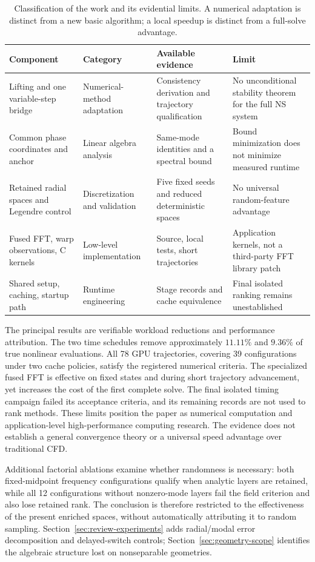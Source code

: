 \begin{table}[!htbp]
\centering\small
\caption{Classification of the work and its evidential limits. A numerical adaptation is distinct from a new basic algorithm; a local speedup is distinct from a full-solve advantage.}
\label{tab:contribution-map}
\begin{tabularx}{\linewidth}{@{}>{\raggedright\arraybackslash}p{.20\linewidth}XXX@{}}
\toprule
Component & Category & Available evidence & Limit \\
\midrule
Lifting and one variable-step bridge & Numerical-method adaptation & Consistency derivation and trajectory qualification & No unconditional stability theorem for the full NS system \\
Common phase coordinates and anchor & Linear algebra analysis & Same-mode identities and a spectral bound & Bound minimization does not minimize measured runtime \\
Retained radial spaces and Legendre control & Discretization and validation & Five fixed seeds and reduced deterministic spaces & No universal random-feature advantage \\
Fused FFT, warp observations, C kernels & Low-level implementation & Source, local tests, short trajectories & Application kernels, not a third-party FFT library patch \\
Shared setup, caching, startup path & Runtime engineering & Stage records and cache equivalence & Final isolated ranking remains unestablished \\
\bottomrule
\end{tabularx}
\end{table}

The principal results are verifiable workload reductions and performance attribution. The two time schedules remove approximately $11.11\%$ and $9.36\%$ of true nonlinear evaluations. All 78 GPU trajectories, covering 39 configurations under two cache policies, satisfy the registered numerical criteria. The specialized fused FFT is effective on fixed states and during short trajectory advancement, yet increases the cost of the first complete solve. The final isolated timing campaign failed its acceptance criteria, and its remaining records are not used to rank methods. These limits position the paper as numerical computation and application-level high-performance computing research. The evidence does not establish a general convergence theory or a universal speed advantage over traditional CFD.

Additional factorial ablations examine whether randomness is necessary: both fixed-midpoint frequency configurations qualify when analytic layers are retained, while all 12 configurations without nonzero-mode layers fail the field criterion and also lose retained rank. The conclusion is therefore restricted to the effectiveness of the present enriched spaces, without automatically attributing it to random sampling. Section~\ref{sec:review-experiments} adds radial/modal error decomposition and delayed-switch controls; Section~\ref{sec:geometry-scope} identifies the algebraic structure lost on nonseparable geometries.


